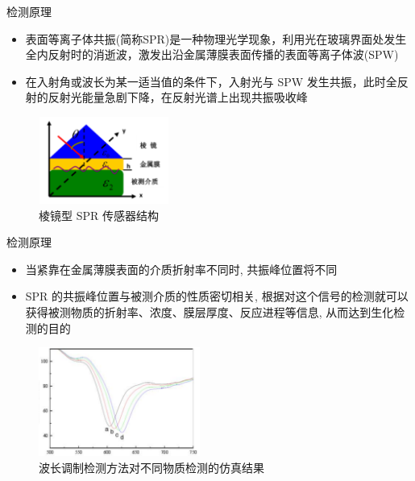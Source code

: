 \documentclass{beamer}
\begin{document}
\begin{frame}{检测原理}
\begin{itemize}
  \item 表面等离子体共振(简称SPR)是一种物理光学现象，利用光在玻璃界面处发生全内反射时的消逝波，激发出沿金属薄膜表面传播的表面等离子体波(SPW)
  \item 在入射角或波长为某一适当值的条件下，入射光与 SPW 发生共振，此时全反射的反射光能量急剧下降，在反射光谱上出现共振吸收峰
\end{itemize}
\begin{figure}
  \includegraphics[height=2.86cm,width=4.29cm]{images/2_2.png}
  \caption{棱镜型 SPR 传感器结构}
\end{figure}
\end{frame}
\begin{frame}{检测原理}
  \begin{itemize}
    \item 当紧靠在金属薄膜表面的介质折射率不同时, 共振峰位置将不同
    \item SPR 的共振峰位置与被测介质的性质密切相关, 根据对这个信号的检测就可以获得被测物质的折射率、浓度、膜层厚度、反应进程等信息, 从而达到生化检测的目的
  \end{itemize}
  \begin{figure}
    \includegraphics[height=3.575cm,width=5.304cm]{images/2_1.png}
    \caption{波长调制检测方法对不同物质检测的仿真结果}
  \end{figure}
\end{frame}

% 
\end{document}
